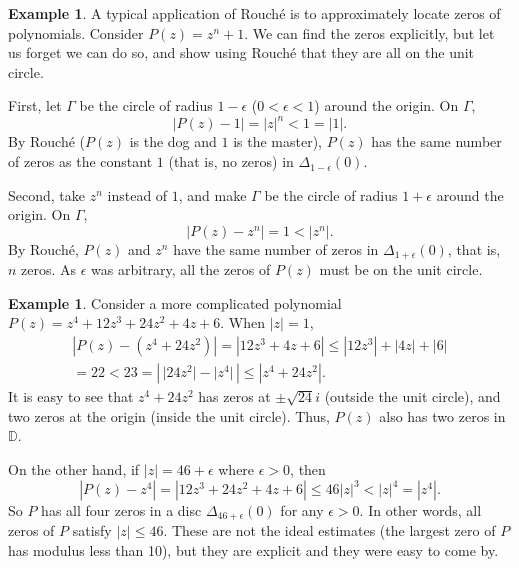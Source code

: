 \documentclass[12pt,openany]{book}
\newcommand{\sabs}[1]{\lvert {#1} \rvert}
\newcommand{\abs}[1]{\left\lvert {#1} \right\rvert}
\newcommand{\D}{{\mathbb{D}}}
\theoremstyle{plain}
\theoremstyle{remark}
\theoremstyle{definition}
\theoremstyle{exercise}
\theoremstyle{example}
\newtheorem{example}[thm]{Example}
\begin{document}
\begin{example}
A typical application of Rouch\'e is to approximately locate zeros of
polynomials.  Consider $P(z) = z^n + 1$.  We can find the zeros explicitly,
but let us forget we can do so,
and show using Rouch\'e that they are all on the unit circle.

First,
let $\Gamma$ be the circle of radius $1-\epsilon$ ($0 < \epsilon < 1$)
around the origin.  On $\Gamma$,
\begin{equation*}
\abs{P(z) - 1} = \abs{z}^n < 1 = \sabs{1}.
\end{equation*}
By Rouch\'e ($P(z)$ is the dog and $1$ is the master), $P(z)$
has the same number of zeros as the constant $1$ (that is, no zeros) in
$\Delta_{1-\epsilon}(0)$.

Second, take $z^n$ instead of $1$, and make $\Gamma$ be the circle of
radius $1+\epsilon$ around the origin.  On $\Gamma$,
\begin{equation*}
\abs{P(z) - z^n} = 1 < \abs{z^n} .
\end{equation*}
By Rouch\'e, $P(z)$ and $z^n$ have the same number of zeros in
$\Delta_{1+\epsilon}(0)$, that is, $n$ zeros.  As $\epsilon$ was arbitrary,
all the zeros of $P(z)$ must be on the unit circle.
\end{example}

\begin{example}
Consider a more complicated polynomial $P(z) = z^4+12z^3+24z^2+4z+6$.
When $\sabs{z}=1$,
\begin{multline*}
\abs{P(z)-(z^4+24z^2)} =
\abs{12z^3+4z+6} \leq
\abs{12z^3}+\abs{4z}+\abs{6} \\
= 22 < 23 = \abs{\,\sabs{24 z^2} - \sabs{z^4}\,}
\leq \abs{z^4+24z^2} .
\end{multline*}
It is easy to see that $z^4+24z^2$ has zeros at $\pm \sqrt{24} i$ (outside
the unit circle), and two zeros at the origin (inside the unit circle).
Thus, $P(z)$ also has two zeros in $\D$.

On the other hand, if $\sabs{z} = 46+ \epsilon$ where $\epsilon > 0$, then
\begin{equation*}
\abs{P(z)-z^4} = \abs{12z^3+24z^2+4z+6}
\leq 46 \sabs{z}^3 < {\sabs{z}}^4 = \abs{z^4}.
\end{equation*}
So $P$ has all four zeros in a disc $\Delta_{46+\epsilon}(0)$ for any
$\epsilon > 0$.
In other words, all zeros of $P$ satisfy $\sabs{z} \leq 46$.
These are not the ideal estimates (the largest zero of $P$ has modulus less than
10), but they are explicit and they were easy to come by.
\end{example}
\end{document}
